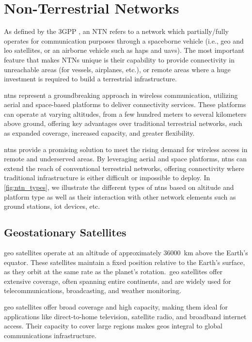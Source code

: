 \chapter{Non-Terrestrial Networks}\label{ch:non_terrestrial_networks}

As defined by the 3GPP \autocite{3gpp2018ntn}, an NTN refers to a network which partially/fully operates for communication purposes through a spaceborne vehicle (i.e., \gls{geo} and \gls{leo} satellites, or an airborne vehicle such as \glspl{hap} and \glspl{uav}). The most important feature that makes NTNs unique is their capability to provide connectivity in unreachable areas (for vessels, airplanes, etc.), or remote areas where a huge investment is required to build a terrestrial infrastructure.

\glspl{ntn} represent a groundbreaking approach in wireless communication, utilizing aerial and space-based platforms to deliver connectivity services. These platforms can operate at varying altitudes, from a few hundred meters to several kilometers above ground, offering key advantages over traditional terrestrial networks, such as expanded coverage, increased capacity, and greater flexibility.

\glspl{ntn} provide a promising solution to meet the rising demand for wireless access in remote and underserved areas. By leveraging aerial and space platforms, \glspl{ntn} can extend the reach of conventional terrestrial networks, offering connectivity where traditional infrastructure is either difficult or impossible to deploy. In \cref{fig:ntn_types}, we illustrate the different types of \glspl{ntn} based on altitude and platform type as well as their interaction with other network elements such as ground stations, \gls{iot} devices, etc.

\section{Geostationary Satellites}

\gls{geo} satellites operate at an altitude of approximately \SI{36000}{\kilo\meter} above the Earth's equator. These satellites maintain a fixed position relative to the Earth’s surface, as they orbit at the same rate as the planet's rotation.\ \gls{geo} satellites offer extensive coverage, often spanning entire continents, and are widely used for telecommunications, broadcasting, and weather monitoring.

\gls{geo} satellites offer broad coverage and high capacity, making them ideal for applications like direct-to-home television, satellite radio, and broadband internet access. Their capacity to cover large regions makes \glspl{geo} integral to global communications infrastructure.


